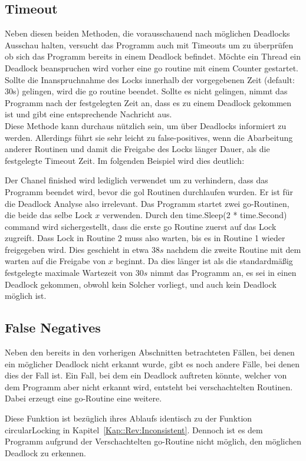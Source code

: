 \subsection{Timeout}
Neben diesen beiden Methoden, die vorausschauend nach möglichen Deadlocks 
Ausschau halten, versucht das Programm auch mit Timeouts um zu überprüfen ob 
sich das Programm bereits in einem Deadlock befindet. Möchte ein Thread ein 
Deadlock beanspruchen wird vorher eine go routine mit einem Counter gestartet.
Sollte die Inanspruchnahme des Locks innerhalb der vorgegebenen Zeit 
(default: 30s) gelingen, wird die go routine beendet. Sollte es nicht gelingen,
nimmt das Programm nach der festgelegten Zeit an, dass es zu einem Deadlock 
gekommen ist und gibt eine entsprechende Nachricht aus.\\
Diese Methode kann
durchaus nützlich sein, um über Deadlocks informiert zu werden. Allerdings führt
sie sehr leicht zu false-positives, wenn die Abarbeitung anderer Routinen und 
damit die Freigabe des Locks länger Dauer, als die festgelegte Timeout Zeit.
Im folgenden Beispiel wird dies deutlich:
\begin{figure}[H]
    
\end{figure}
Der Chanel finished wird lediglich verwendet um zu verhindern, dass das Programm 
beendet wird, bevor die gol Routinen durchlaufen wurden. Er ist für die Deadlock
Analyse also irrelevant. Das Programm startet zwei go-Routinen, die beide das 
selbe Lock $x$ verwenden. Durch den time.Sleep(2 * time.Second) command wird 
sichergestellt, dass die erste go Routine zuerst auf das Lock zugreift. 
Dass Lock in Routine 2 muss also warten, bis es in Routine 1 wieder freigegeben
wird. Dies geschieht in etwa $38 s$ nachdem die zweite Routine mit dem warten 
auf die Freigabe von $x$ beginnt. Da dies länger ist als die standardmäßig
festgelegte maximale Wartezeit von $30 s$ nimmt das Programm an, es sei in einen 
Deadlock gekommen, obwohl kein Solcher vorliegt, und auch kein Deadlock möglich 
ist.

\subsection{False Negatives}
Neben den bereits in den vorherigen Abschnitten betrachteten Fällen, bei denen 
ein möglicher Deadlock nicht erkannt wurde, gibt es noch andere Fälle, bei denen
dies der Fall ist. Ein Fall,
bei dem ein Deadlock auftreten könnte, welcher von dem Programm aber nicht erkannt
wird, entsteht bei verschachtelten Routinen. Dabei erzeugt eine go-Routine eine 
weitere.
\begin{figure}[H]
    
\end{figure}
Diese Funktion ist bezüglich ihres Ablaufs identisch zu der Funktion 
circularLocking in Kapitel~\ref*{Kap::Rev:Inconsistent}. Dennoch ist es dem 
Programm aufgrund der Verschachtelten go-Routine nicht möglich, den möglichen 
Deadlock zu erkennen. 

